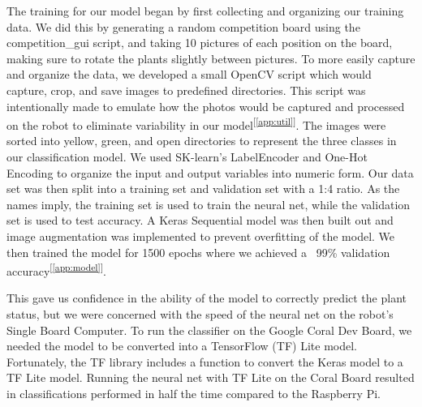 \documentclass[11pt, twoside]{report}
\newcommand{\refapp}[1]{\textsuperscript{[\ref{#1}]}}
\begin{document}
The training for our model began by first collecting and organizing our training data. We did this by generating a random competition board using the competition\_gui script, and taking 10 pictures of each position on the board, making sure to rotate the plants slightly between pictures. To more easily capture and organize the data, we developed a small OpenCV script which would capture, crop, and save images to predefined directories. This script was intentionally made to emulate how the photos would be captured and processed on the robot to eliminate variability in our model\refapp{app:util}. The images were sorted into yellow, green, and open directories to represent the three classes in our classification model. We used SK-learn’s LabelEncoder and One-Hot Encoding to organize the input and output variables into numeric form. Our data set was then split into a training set and validation set with a 1:4 ratio. As the names imply, the training set is used to train the neural net, while the validation set is used to test accuracy. A Keras Sequential model was then built out and image augmentation was implemented to prevent overfitting of the model. We then trained the model for 1500 epochs where we achieved a ~99\% validation accuracy\refapp{app:model}.

This gave us confidence in the ability of the model to correctly predict the plant status, but we were concerned with the speed of the neural net on the robot’s Single Board Computer. To run the classifier on the Google Coral Dev Board, we needed the model to be converted into a TensorFlow (TF) Lite model. Fortunately, the TF library includes a function to convert the Keras model to a TF Lite model. Running the neural net with TF Lite on the Coral Board resulted in classifications performed in half the time compared to the Raspberry Pi.
\end{document}
